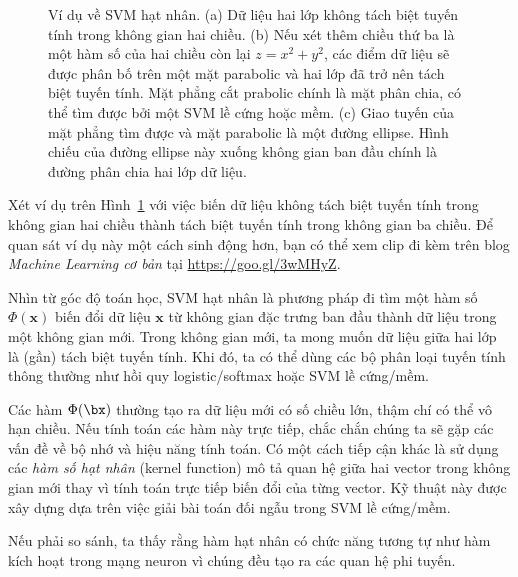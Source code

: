 \begin{figure}[t]
    \caption{
    Ví dụ về SVM hạt nhân. (a) Dữ liệu hai lớp không tách biệt tuyến tính trong không gian hai chiều. (b) Nếu xét thêm chiều thứ ba là một hàm số
    của hai chiều còn lại $z = x^2 + y^2$, các điểm dữ liệu sẽ được phân bố trên
    một mặt parabolic và hai lớp đã trở nên tách biệt tuyến tính. Mặt
    phẳng cắt prabolic chính là mặt phân chia, có thể tìm được bởi một 
    SVM lề cứng hoặc mềm. (c) Giao tuyến của mặt phẳng tìm được và mặt
    parabolic là một đường ellipse. Hình chiếu của đường ellipse này xuống không gian ban đầu chính là đường phân chia hai lớp dữ liệu.}
    \label{fig:21_1}
\end{figure}
Xét ví dụ trên Hình~\ref{fig:21_1} với việc biến dữ liệu không tách biệt tuyến tính trong không gian hai chiều thành tách biệt tuyến tính trong
không gian ba chiều. Để quan sát ví dụ này
một cách sinh động hơn, bạn có thể xem clip đi kèm trên blog \textit{Machine
Learning cơ bản} tại \url{https://goo.gl/3wMHyZ}.
 
 
Nhìn từ góc độ toán học, SVM hạt nhân là phương pháp đi tìm một hàm số
$\Phi(\mathbf{x})$ biến đổi dữ liệu $\mathbf{x}$ từ không gian đặc trưng ban đầu
thành dữ liệu trong một không gian mới. Trong không gian mới, ta mong muốn dữ
liệu giữa hai lớp là (gần) tách biệt tuyến tính. Khi
đó, ta có thể dùng các bộ phân loại tuyến tính thông thường như hồi quy logistic/softmax hoặc SVM lề cứng/mềm. 


Các hàm $\Phi(\bx)$ thường tạo ra dữ liệu mới có số chiều lớn, thậm chí có thể vô hạn chiều. Nếu tính toán các hàm này trực tiếp,
chắc chắn chúng ta sẽ gặp các vấn đề về bộ nhớ và hiệu năng tính toán. Có một
cách tiếp cận khác là sử dụng các \textit{hàm số hạt nhân} (kernel function) mô tả quan hệ giữa hai
vector trong không gian mới thay vì tính toán trực tiếp biến
đổi của từng vector. Kỹ thuật này được xây dựng dựa
trên việc giải bài toán đối ngẫu trong SVM lề cứng/mềm.
 

Nếu phải so sánh, ta thấy rằng hàm hạt nhân có chức năng
tương tự như hàm kích hoạt trong mạng neuron vì chúng đều tạo ra các quan hệ phi tuyến.
\newpage 
 
